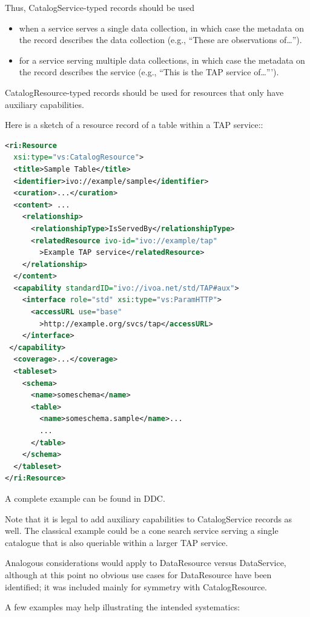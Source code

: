 \documentclass[11pt,a4paper]{ivoa}
\begin{document}
Thus, CatalogService-typed records should be used

\begin{itemize}
\item when a service serves a single data collection, in which case the
metadata on the record describes the data collection (e.g., ``These are
observations of\dots'').
\item for a service serving multiple data collections, in which case the
metadata on the record  describes the service (e.g., ``This is the TAP
service of\dots''').
\end{itemize}

CatalogResource-typed records should be used for resources that only
have auxiliary capabilities.

Here is a sketch of a resource record of a table within a TAP service::

\begin{lstlisting}[language=XML,basicstyle=\footnotesize]
<ri:Resource
  xsi:type="vs:CatalogResource">
  <title>Sample Table</title>
  <identifier>ivo://example/sample</identifier>
  <curation>...</curation>
  <content> ...
    <relationship>
      <relationshipType>IsServedBy</relationshipType>
      <relatedResource ivo-id="ivo://example/tap"
        >Example TAP service</relatedResource>
    </relationship>
  </content>
  <capability standardID="ivo://ivoa.net/std/TAP#aux">
    <interface role="std" xsi:type="vs:ParamHTTP">
      <accessURL use="base"
        >http://example.org/svcs/tap</accessURL>
    </interface>
 </capability>
  <coverage>...</coverage>
  <tableset>
    <schema>
      <name>someschema</name>
      <table>
        <name>someschema.sample</name>...
        ...
      </table>
    </schema>
  </tableset>
</ri:Resource>
\end{lstlisting}

A complete example can be found in DDC.

Note that it is legal to add auxiliary capabilities to CatalogService
records as well.  The classical example could be a cone search service
serving a single catalogue that is also queriable within a larger TAP
service.

Analogous considerations would apply to DataResource versus DataService,
although at this point no obvious use cases for DataResource
have been identified;
it was included mainly for symmetry with CatalogResource.

A few examples may help illustrating the intended systematics:
\end{document}
